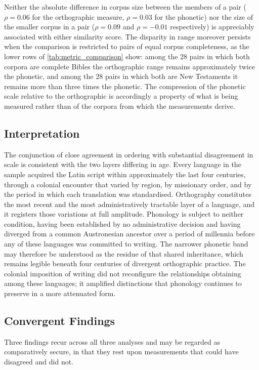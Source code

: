 Neither the absolute difference in
corpus size between the members of a pair (\( \rho = 0.06 \) for the
orthographic measure, \( \rho = 0.03 \) for the phonetic) nor the size of the
smaller corpus in a pair (\( \rho = 0.09 \) and \( \rho = -0.01 \)
respectively) is appreciably associated with either similarity score. The
disparity in range moreover persists when the comparison is restricted to pairs
of equal corpus completeness, as the lower rows of \cref{tab:metric_comparison}
show: among the 28 pairs in which both corpora are complete Bibles the
orthographic range remains approximately twice the phonetic, and among the 28
pairs in which both are New Testaments it remains more than three times the
phonetic. The compression of the phonetic scale relative to the orthographic is
accordingly a property of what is being measured rather than of the corpora from
which the measurements derive.

\subsection{Interpretation}

The conjunction of close agreement in ordering with substantial disagreement in
scale is consistent with the two layers differing in age. Every language in the
sample acquired the Latin script within approximately the last four centuries,
through a colonial encounter that varied by region, by missionary order, and by
the period in which each translation was standardised. Orthography constitutes
the most recent and the most administratively tractable layer of a language, and
it registers those variations at full amplitude. Phonology is subject to neither
condition, having been established by no administrative decision and having
diverged from a common Austronesian ancestor over a period of millennia before
any of these languages was committed to writing. The narrower phonetic band may
therefore be understood as the residue of that shared inheritance, which remains
legible beneath four centuries of divergent orthographic practice. The colonial
imposition of writing did not reconfigure the relationships obtaining among
these languages; it amplified distinctions that phonology continues to preserve
in a more attenuated form.

\subsection{Convergent Findings}

Three findings recur across all three analyses and may be regarded as
comparatively secure, in that they rest upon measurements that could have
disagreed and did not.

